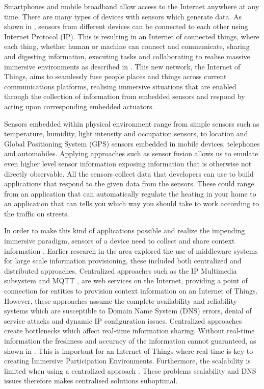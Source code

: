 Smartphones and mobile broadband allow access to the Internet anywhere at any time. There are many types of devices with sensors which generate data. As shown in \cite{chui2010internet}, sensors from different devices can be connected to each other using Internet Protocol (IP). This is resulting in an Internet of connected things, where each thing, whether human or machine can connect and communicate, sharing and digesting information, executing tasks and collaborating to realise massive immersive environments as described in \cite{tan2010future}. This new network, the Internet of Things, aims to seamlessly fuse people places and things across current communications platforms, realising immersive situations that are enabled through the collection of information from embedded sensors and respond by acting upon corresponding embedded actuators. 

Sensors embedded within physical environment range from simple sensors such as temperature, humidity, light intensity and occupation sensors, to location and Global Positioning System (GPS) sensors embedded in mobile devices, telephones and automobiles. Applying approaches such as sensor fusion allows us to emulate even higher level sensor information exposing information that is otherwise not directly observable. All the sensors collect data that developers can use to build applications that respond to the given data from the sensors. These could range from an application that can automatically regulate the heating in your home to an application that can tells you which way you should take to work according to the traffic on streets.

In order to make this kind of applications possible and realize the impending immersive paradigm, sensors of a device need to collect and share context information \cite{dey2001understanding}. Earlier research in the area explored the use of middleware systems for large scale information provisioning, these included both centralized and distributed approaches. Centralized approaches such as the IP Multimedia subsystem \cite{Kardeby:2010:UMF:1845879.1846331} and MQTT \cite{HunkelerTS08}, are web services on the Internet, providing a point of connection for entities to provision context information on an Internet of Things. However, these approaches assume the complete availability and reliability systems which are susceptible to Domain Name System (DNS) errors, denial of service attacks and dynamic IP configuration issues. Centralized approaches create bottlenecks which affect real-time information sharing. Without real-time information the freshness and accuracy of the information cannot guaranteed, as shown in \cite{Walters437970}. This is important for an Internet of Things where real-time is key to creating Immersive Participation Environments. Furthermore, the scalability is limited when using a centralized approach \cite{Kanter539187}. These problems scalability and DNS issues therefore makes centralised solutions suboptimal. %


